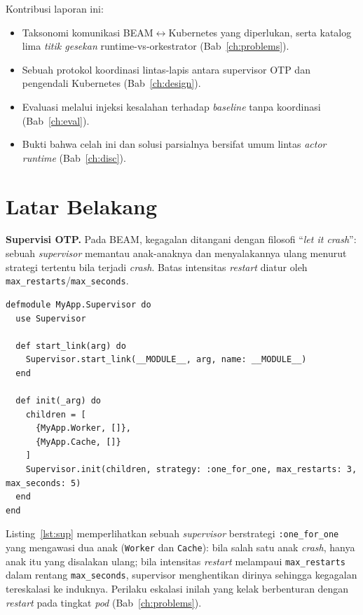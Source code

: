 \documentclass[11pt,a4paper]{report}
\begin{document}
\noindent Kontribusi laporan ini:
\begin{itemize}[nosep]
  \item Taksonomi komunikasi BEAM$\leftrightarrow$Kubernetes yang diperlukan, serta katalog
        lima \emph{titik gesekan} runtime-vs-orkestrator (Bab~\ref{ch:problems}).
  \item Sebuah protokol koordinasi lintas-lapis antara supervisor OTP dan pengendali
        Kubernetes (Bab~\ref{ch:design}).
  \item Evaluasi melalui injeksi kesalahan terhadap \emph{baseline} tanpa koordinasi
        (Bab~\ref{ch:eval}).
  \item Bukti bahwa celah ini dan solusi parsialnya bersifat umum lintas \emph{actor
        runtime} (Bab~\ref{ch:disc}).
\end{itemize}

\chapter{Latar Belakang}
\label{ch:background}
\textbf{Supervisi OTP.} Pada BEAM, kegagalan ditangani dengan filosofi ``\emph{let it
crash}'': sebuah \emph{supervisor} memantau anak-anaknya dan menyalakannya ulang menurut
strategi tertentu bila terjadi \emph{crash}. Batas intensitas \emph{restart} diatur oleh
\texttt{max\_restarts}/\texttt{max\_seconds}.

\begin{lstlisting}[caption={Contoh \emph{supervision tree} OTP sederhana.}, label={lst:sup}]
defmodule MyApp.Supervisor do
  use Supervisor

  def start_link(arg) do
    Supervisor.start_link(__MODULE__, arg, name: __MODULE__)
  end

  def init(_arg) do
    children = [
      {MyApp.Worker, []},
      {MyApp.Cache, []}
    ]
    Supervisor.init(children, strategy: :one_for_one, max_restarts: 3, max_seconds: 5)
  end
end
\end{lstlisting}

Listing~\ref{lst:sup} memperlihatkan sebuah \emph{supervisor} berstrategi
\texttt{:one\_for\_one} yang mengawasi dua anak (\texttt{Worker} dan \texttt{Cache}):
bila salah satu anak \emph{crash}, hanya anak itu yang disalakan ulang; bila intensitas
\emph{restart} melampaui \texttt{max\_restarts} dalam rentang \texttt{max\_seconds},
supervisor menghentikan dirinya sehingga kegagalan tereskalasi ke induknya. Perilaku
eskalasi inilah yang kelak berbenturan dengan \emph{restart} pada tingkat \emph{pod}
(Bab~\ref{ch:problems}).
\end{document}
